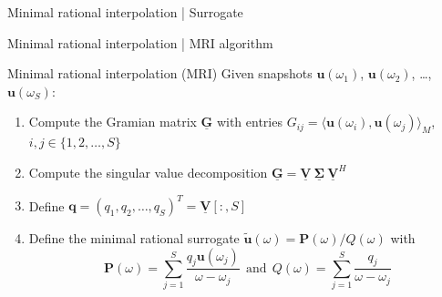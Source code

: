 \documentclass{beamer}
\begin{document}
\begin{frame}{Minimal rational interpolation | Surrogate}

    \vspace{20pt}

\end{frame}

\begin{frame}{Minimal rational interpolation | MRI algorithm}

    \begin{block}{Minimal rational interpolation (MRI) \cite{greedyMRI}}
        Given snapshots $\mathbf{u}(\omega_1)$, $\mathbf{u}(\omega_2)$, \dots, $\mathbf{u}(\omega_S)$:
        \begin{enumerate}
            \item<2-> Compute the Gramian matrix $\mathbf{\underline{G}}$ with entries $G_{ij} = \langle \mathbf{u}(\omega_i), \mathbf{u}(\omega_j) \rangle_M$, $i,j \in \{1, 2, \dots, S\}$
            \item<3-> Compute the singular value decomposition $\mathbf{\underline{G}} = \mathbf{\underline{V}}~\boldsymbol{\underline{\Sigma}}~\mathbf{\underline{V}}^H$
            \item<4-> Define $\mathbf{q} = (q_1, q_2, \dots, q_S)^T = \mathbf{\underline{V}}[:, S]$
            \item<5-> Define the minimal rational surrogate $\mathbf{\tilde{u}}(\omega) = \mathbf{P}(\omega) / Q(\omega)$ with 
            \begin{equation*}
                \mathbf{P}(\omega) = \sum_{j=1}^S \frac{q_j \mathbf{u}(\omega_j)}{\omega - \omega_j}~~\text{and}~~Q(\omega) = \sum_{j=1}^S \frac{q_j}{\omega - \omega_j}
            \end{equation*}
        \end{enumerate}
    \end{block}

\end{frame}
\end{document}
